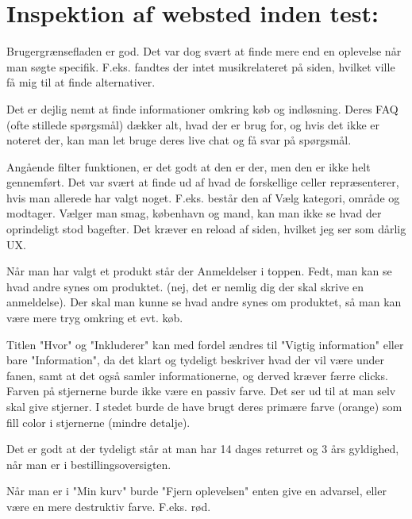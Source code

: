 \documentclass[12pt,a4paper,oneside]{article}
\author{Bertram A. Nicolas, Christian Enevoldsen}
\begin{document}
\section*{Inspektion af websted inden test:}

Brugergrænsefladen er god. Det var dog svært at finde mere end en oplevelse når man søgte specifik. F.eks. fandtes der intet musikrelateret på siden, hvilket ville få mig til at finde alternativer.\newline

Det er dejlig nemt at finde informationer omkring køb og indløsning. Deres FAQ (ofte stillede spørgsmål) dækker alt, hvad der er brug for, og hvis det ikke er noteret der, kan man let bruge deres live chat og få svar på spørgsmål.\newline

Angående filter funktionen, er det godt at den er der, men den er ikke helt gennemført. Det var svært at finde ud af hvad de forskellige celler repræsenterer, hvis man allerede har valgt noget. F.eks. består den af Vælg kategori, område og modtager. Vælger man smag, københavn og mand, kan man ikke se hvad der oprindeligt stod bagefter. Det kræver en reload af siden, hvilket jeg ser som dårlig UX.\newline

Når man har valgt et produkt står der Anmeldelser i toppen. Fedt, man kan se hvad andre synes om produktet. (nej, det er nemlig dig der skal skrive en anmeldelse). Der skal man kunne se hvad andre synes om produktet, så man kan være mere tryg omkring et evt. køb.\newline


Titlen "Hvor" og "Inkluderer" kan med fordel ændres til "Vigtig information" eller bare "Information", da det klart og tydeligt beskriver hvad der vil være under fanen, samt at det også samler informationerne, og derved kræver færre clicks.
Farven på stjernerne burde ikke være en passiv farve. Det ser ud til at man selv skal give stjerner. I stedet burde de have brugt deres primære farve (orange) som fill color i stjernerne (mindre detalje).\newline

Det er godt at der tydeligt står at man har 14 dages returret og 3 års gyldighed, når man er i bestillingsoversigten.\newline

Når man er i "Min kurv" burde "Fjern oplevelsen" enten give en advarsel, eller være en mere destruktiv farve. F.eks. rød.\newline
\end{document}
